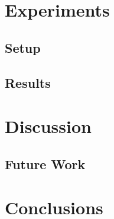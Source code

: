 \documentclass[twoside,openright]{uva-bachelor-thesis}
\begin{document}
\chapter{Experiments}
\section{Setup}
\section{Results}

\chapter{Discussion}
\section{Future Work}
\chapter{Conclusions}


\printbibliography{}
\end{document}
